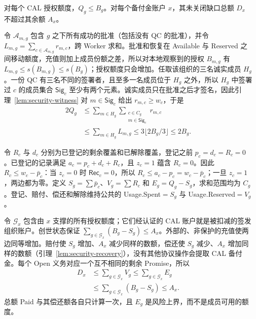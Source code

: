 \begin{theorem}[潜在负债均有资金支撑]
\label{thm:security-coverage}
对每个 CAL 授权额度，$Q_g\le B_g$。对每个备付金账户 $x$，其未关闭缺口总额 $D_x$ 不超过其余额 $A_x$。
\end{theorem}
\begin{IEEEproof}
令 $\mathcal A_{m,g}$ 包含 $g$ 之下所有成功的批准（包括没有 QC 的批准），并令 $L_{m,g}=\sum_{c\in\mathcal A_{m,g}}r_{m,c}$，跨 Worker 求和。批准和恢复在 Available 与 Reserved 之间移动额度，充值则加上成员份额之差，所以对本地观察到的授权 $B_{m,g}$ 有 $L_{m,g}\le s(B_{m,g})\le s(B_g)$；授权额度只会增加。任取该组织的三名诚实成员 $H_g$。一份 QC 有三名不同的签署者，且至多一名成员位于 $H_g$ 之外，所以 $H_g$ 中签署过 $c$ 的成员集合 $\mathsf{Sig}_c$ 至少有两个元素。诚实成员只在批准之后才签名，因此引理~\ref{lem:security-witness} 对 $m\in\mathsf{Sig}_c$ 给出 $r_{m,c}\ge w_c$，于是
\begin{equation}
\begin{aligned}
  2Q_g
  &\le\sum_{m\in H_g}\sum_{\substack{c\in C_g\\m\in\mathsf{Sig}_c}}r_{m,c}\\
  &\le\sum_{m\in H_g}L_{m,g}
  \le3\lfloor2B_g/3\rfloor\le2B_g.
\end{aligned}
\label{eq:security-counting}
\end{equation}

令 $R_c$ 与 $d_c$ 分别为已登记的剩余覆盖和已解除覆盖，登记之前 $p_c=d_c=R_c=0$。已登记的记录满足 $a_c=p_c+d_c+R_c$，且 $z_c=1$ 蕴含 $R_c=0$。因此 $R_c\le w_c-\bar p_c$：当 $z_c=0$ 时 $\mathsf{Rec}_c=0$，所以 $R_c\le a_c-p_c=w_c-\bar p_c$；一旦 $z_c=1$，两边都为零。定义 $S_g=\sum\bar p_c$、$V_g=\sum R_c$ 和 $E_g=Q_g-S_g$，求和范围均为 $C_g$。登记、赔付、偿还和解除维持公共的 Usage.Spent$=S_g$ 与 Usage.Reserved$=V_g$。

令 $\mathcal G_x$ 包含由 $x$ 支撑的所有授权额度；它们经认证的 CAL 账户就是被扣减的签发组织账户。创世状态保证 $\sum_{g\in\mathcal G_x}(B_g-S_g)\le A_x$。外部的、非保护的充值使两边同等增加。赔付使 $S_g$ 增加、$A_x$ 减少同样的数额，偿还使 $S_g$ 减少、$A_x$ 增加同样的数额（引理~\ref{lem:security-recovery}），没有其他协议操作会提取 CAL 备付金。每个 Open 义务对应一个互不相同的剩余 Promise，所以
\begin{equation}
\begin{aligned}
D_x&\le\sum_{g\in\mathcal G_x}V_g
    \le\sum_{g\in\mathcal G_x}E_g\\
   &\le\sum_{g\in\mathcal G_x}(B_g-S_g)\le A_x.
\end{aligned}
\label{eq:security-backing}
\end{equation}
总额 Paid 与其偿还额各自只计算一次，且 $E_g$ 是风险上界，而不是成员可用的额度。
\end{IEEEproof}


